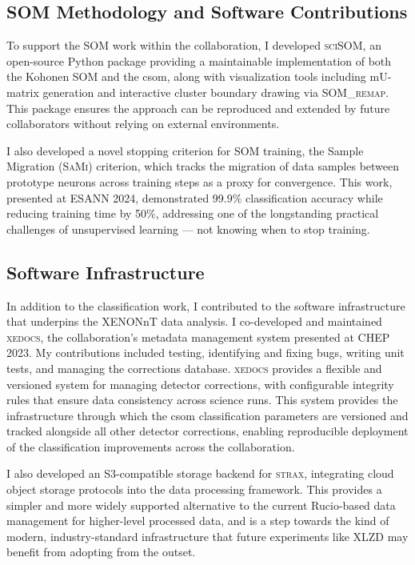 \subsection*{SOM Methodology and Software Contributions}

To support the SOM work within the collaboration, I developed \textsc{sciSOM}, an open-source Python package providing a maintainable implementation of both the Kohonen SOM and the \acrshort{csom}, along with visualization tools including mU-matrix generation and interactive cluster boundary drawing via \textsc{SOM\_remap}. This package ensures the approach can be reproduced and extended by future collaborators without relying on external environments.

I also developed a novel stopping criterion for SOM training, the Sample Migration (\textsc{SaMi}) criterion, which tracks the migration of data samples between prototype neurons across training steps as a proxy for convergence. This work, presented at ESANN 2024, demonstrated 99.9\% classification accuracy while reducing training time by 50\%, addressing one of the longstanding practical challenges of unsupervised learning — not knowing when to stop training.

\subsection*{Software Infrastructure}

In addition to the classification work, I contributed to the software infrastructure that underpins the XENONnT data analysis. I co-developed and maintained \textsc{xedocs}, the collaboration's metadata management system presented at CHEP 2023. My contributions included testing, identifying and fixing bugs, writing unit tests, and managing the corrections database. \textsc{xedocs} provides a flexible and versioned system for managing detector corrections, with configurable integrity rules that ensure data consistency across science runs. This system provides the infrastructure through which the \acrshort{csom} classification parameters are versioned and tracked alongside all other detector corrections, enabling reproducible deployment of the classification improvements across the collaboration.

I also developed an S3-compatible storage backend for \textsc{strax}, integrating cloud object storage protocols into the data processing framework. This provides a simpler and more widely supported alternative to the current Rucio-based data management for higher-level processed data, and is a step towards the kind of modern, industry-standard infrastructure that future experiments like XLZD may benefit from adopting from the outset.

